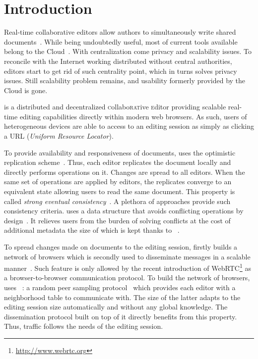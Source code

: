 
\section{Introduction}
\label{sec:introduction}

Real-time collaborative editors allow authors to simultaneously write shared
documents~\cite{greenberg1994real}. While being undoubtedly useful, most of
current tools available belong to the Cloud~\cite{mell2011national}. With
centralization come privacy and scalability issues. To reconcile with the
Internet working distributed without central authorities, editors start to get
rid of such centrality point, which in turns solves privacy issues. Still
scalability problem remains, and usability formerly provided by the Cloud is
gone.

\CRATE is a distributed and decentralized \textsc{c}ollabo\textsc{rat}ive
\textsc{e}ditor providing scalable real-time editing capabilities directly
within modern web browsers. As such, users of heterogeneous devices are able to
access to an editing session as simply as clicking a URL (\emph{Uniform Resource
  Locator}).

To provide availability and responsiveness of documents, \CRATE uses the
optimistic replication scheme~\cite{saito2005optimistic}. Thus, each editor
replicates the document locally and directly performs operations on it. Changes
are spread to all editors. When the same set of operations are applied by
editors, the replicates converge to an equivalent state allowing users to read
the same document.  This property is called \emph{strong eventual
  consistency}~\cite{bailis2013eventual}. A plethora of approaches provide such
consistency criteria. \CRATE uses a data structure that avoids conflicting
operations by design~\cite{shapiro2011comprehensive}. It relieves users from the
burden of solving conflicts at the cost of additional metadata the size of which
is kept  thanks to \LSEQ~\cite{nedelec2013lseq}.

To spread changes made on documents to the editing session, \CRATE firstly
builds a network of browsers which is secondly used to disseminate messages in a
scalable manner~\cite{birman1999bimodal}. Such feature is only allowed by the
recent introduction of WebRTC\footnote{\url{http://www.webrtc.org}} as a
browser-to-browser communication protocol. To build the network of browsers,
\CRATE uses \SPRAY~\cite{nedelec2015spray}: a random peer sampling
protocol~\cite{jelasity2007gossip} which provides each editor with a
neighborhood table to communicate with. The size of the latter adapts to the
editing session size automatically and without any global knowledge. The
dissemination protocol built on top of it directly benefits from this
property. Thus, traffic follows the needs of the editing session.


